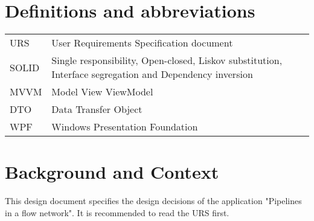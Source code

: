 \documentclass[12pt]{report}
\begin{document}

\restoregeometry 
\nopagecolor

\begingroup
\let\cleardoublepage\relax
\let\clearpage\relax

\section*{Definitions and abbreviations}
\begin{longtable}[l]{p{50pt} p{350pt}} 
URS & User Requirements Specification document\\ 
SOLID & Single responsibility, Open-closed, Liskov substitution, Interface segregation and Dependency inversion\\
MVVM & Model View ViewModel\\ 
DTO & Data Transfer Object\\ 
WPF & Windows Presentation Foundation\\ 
\end{longtable}

\section*{Background and Context}
This design document specifies the design decisions of the application "Pipelines in a flow network". It is recommended to read the URS first.

\tableofcontents
\endgroup




\end{document}
